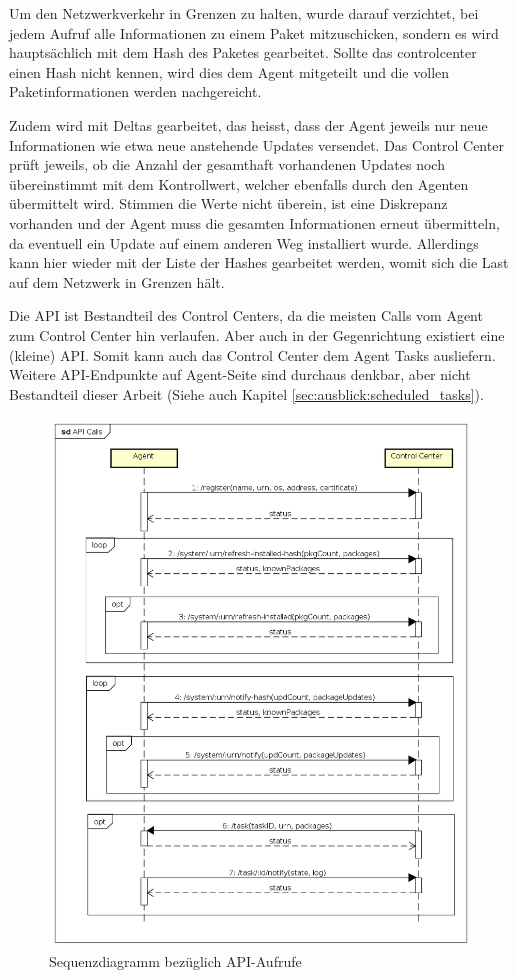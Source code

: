 Um den Netzwerkverkehr in Grenzen zu halten, wurde darauf verzichtet, bei jedem Aufruf alle Informationen zu einem Paket mitzuschicken, sondern es wird hauptsächlich mit dem Hash des Paketes gearbeitet. Sollte das \gls{controlcenter} einen Hash nicht kennen, wird dies dem Agent mitgeteilt und die vollen Paketinformationen werden nachgereicht.

Zudem wird mit Deltas gearbeitet, das heisst, dass der Agent jeweils nur neue Informationen wie etwa neue anstehende Updates versendet. Das Control Center prüft jeweils, ob die Anzahl der gesamthaft vorhandenen Updates noch übereinstimmt mit dem Kontrollwert, welcher ebenfalls durch den Agenten übermittelt wird. Stimmen die Werte nicht überein, ist eine Diskrepanz vorhanden und der Agent muss die gesamten Informationen erneut übermitteln, da eventuell ein Update auf einem anderen Weg installiert wurde. Allerdings kann hier wieder mit der Liste der Hashes gearbeitet werden, womit sich die Last auf dem Netzwerk in Grenzen hält.

Die API ist Bestandteil des Control Centers, da die meisten Calls vom Agent zum Control Center hin verlaufen. Aber auch in der Gegenrichtung existiert eine (kleine) API. Somit kann auch das Control Center dem Agent Tasks ausliefern. Weitere API-Endpunkte auf Agent-Seite sind durchaus denkbar, aber nicht Bestandteil dieser Arbeit (Siehe auch Kapitel \ref{sec:ausblick:scheduled_tasks}).

\clearpage
\begin{figure}
  \centering
    \includegraphics[width=\textwidth]{files/API_Calls}
  \caption{Sequenzdiagramm bezüglich API-Aufrufe}
  \label{fig:api_sequence_diagram}
\end{figure}

